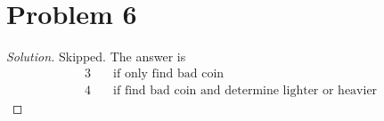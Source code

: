 \section*{Problem 6}
\begin{proof} [Solution]
	Skipped. The answer is
	\begin{align*}
			3\quad & \mbox{if only find bad coin} \\
			4\quad & \mbox{if find bad coin and determine lighter or heavier}
	\end{align*}
\end{proof}